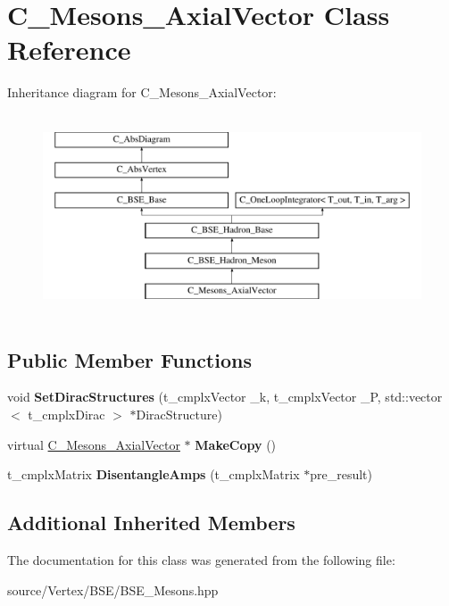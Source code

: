 \hypertarget{class_c___mesons___axial_vector}{\section{C\-\_\-\-Mesons\-\_\-\-Axial\-Vector Class Reference}
\label{class_c___mesons___axial_vector}
}
Inheritance diagram for C\-\_\-\-Mesons\-\_\-\-Axial\-Vector\-:\begin{figure}[H]
\begin{center}
\leavevmode
\includegraphics[height=6.000000cm]{class_c___mesons___axial_vector}
\end{center}
\end{figure}
\subsection*{Public Member Functions}
\begin{DoxyCompactItemize}
\item 
\hypertarget{class_c___mesons___axial_vector_add87e06c484c9e115e1510386b2f43fa}{void {\bfseries Set\-Dirac\-Structures} (t\-\_\-cmplx\-Vector \-\_\-k, t\-\_\-cmplx\-Vector \-\_\-\-P, std\-::vector$<$ t\-\_\-cmplx\-Dirac $>$ $\ast$Dirac\-Structure)}\label{class_c___mesons___axial_vector_add87e06c484c9e115e1510386b2f43fa}

\item 
\hypertarget{class_c___mesons___axial_vector_ab997718c834a05ee9bdc015c013d9dcd}{virtual \hyperlink{class_c___mesons___axial_vector}{C\-\_\-\-Mesons\-\_\-\-Axial\-Vector} $\ast$ {\bfseries Make\-Copy} ()}\label{class_c___mesons___axial_vector_ab997718c834a05ee9bdc015c013d9dcd}

\item 
\hypertarget{class_c___mesons___axial_vector_a8c165af2052746923638b1560da9367e}{t\-\_\-cmplx\-Matrix {\bfseries Disentangle\-Amps} (t\-\_\-cmplx\-Matrix $\ast$pre\-\_\-result)}\label{class_c___mesons___axial_vector_a8c165af2052746923638b1560da9367e}

\end{DoxyCompactItemize}
\subsection*{Additional Inherited Members}


The documentation for this class was generated from the following file\-:\begin{DoxyCompactItemize}
\item 
source/\-Vertex/\-B\-S\-E/B\-S\-E\-\_\-\-Mesons.\-hpp\end{DoxyCompactItemize}
